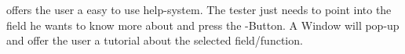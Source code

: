 \bxname{\jb{}} offers the user a easy to use help-system. The tester
just needs to point into  the field he wants to know more
about and press the -Button. A Window will pop-up and
offer the user  a tutorial about the selected field/function. 

